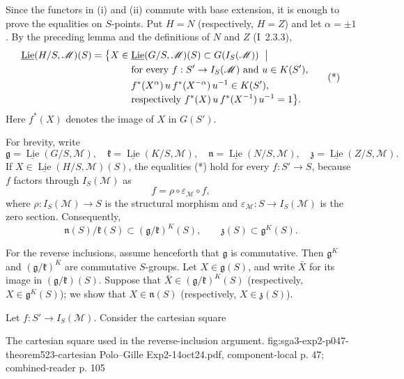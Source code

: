 Since the functors in (i) and (ii) commute with base extension, it is
enough to prove the equalities on \(S\)-points. Put \(H=N\)
(respectively, \(H=Z\)) and let \(\alpha=\pm1\). By the preceding
lemma and the definitions of \(N\) and \(Z\) (I~2.3.3),
\begin{equation}
\begin{split}
 \underline{\operatorname{Lie}}(H/S,\mathscr M)(S)
 =\bigl\{X\in{}&
 \underline{\operatorname{Lie}}(G/S,\mathscr M)(S)
 \subset G(I_S(\mathscr M))\ \bigm|\ \\
 &\text{for every }f:S'\to I_S(\mathscr M)
 \text{ and }u\in K(S'),\\
 &f^*(X^\alpha)\,u\,f^*(X^{-\alpha})\,u^{-1}\in K(S'),\\[-2pt]
 &\text{respectively }
 f^*(X)\,u\,f^*(X^{-1})\,u^{-1}=1
 \bigr\}.
\end{split}
\tag{*}
\end{equation}
Here \(f^*(X)\) denotes the image of \(X\) in \(G(S')\).

For brevity, write
\[
 \mathfrak g=\underline{\operatorname{Lie}}(G/S,\mathscr M),\quad
 \mathfrak k=\underline{\operatorname{Lie}}(K/S,\mathscr M),\quad
 \mathfrak n=\underline{\operatorname{Lie}}(N/S,\mathscr M),\quad
 \mathfrak z=\underline{\operatorname{Lie}}(Z/S,\mathscr M).
\]
If \(X\in\underline{\operatorname{Lie}}(H/S,\mathscr M)(S)\), the
equalities (*) hold for every \(f:S'\to S\), because \(f\) factors
through \(I_S(\mathscr M)\) as
\[
 f=\rho\circ\varepsilon_{\mathscr M}\circ f,
\]
where \(\rho:I_S(\mathscr M)\to S\) is the structural morphism and
\(\varepsilon_{\mathscr M}:S\to I_S(\mathscr M)\) is the zero section.
Consequently,
\[
 \mathfrak n(S)/\mathfrak k(S)
   \subset(\mathfrak g/\mathfrak k)^K(S),
 \qquad
 \mathfrak z(S)\subset\mathfrak g^K(S).
\]

For the reverse inclusions, assume henceforth that
\(\mathfrak g\) is commutative. Then
\(\mathfrak g^K\) and \((\mathfrak g/\mathfrak k)^K\) are commutative
\(S\)-groups. Let \(X\in\mathfrak g(S)\), and write \(\bar X\) for its
image in \((\mathfrak g/\mathfrak k)(S)\). Suppose that
\(\bar X\in(\mathfrak g/\mathfrak k)^K(S)\) (respectively,
\(X\in\mathfrak g^K(S)\)); we show that
\(X\in\mathfrak n(S)\) (respectively, \(X\in\mathfrak z(S)\)).

Let \(f:S'\to I_S(\mathscr M)\). Consider the cartesian square

  {The cartesian square used in the reverse-inclusion argument.}
  {fig:sga3-exp2-p047-theorem523-cartesian}
  {Polo--Gille Exp2-14oct24.pdf, component-local p. 47;
   combined-reader p. 105}

